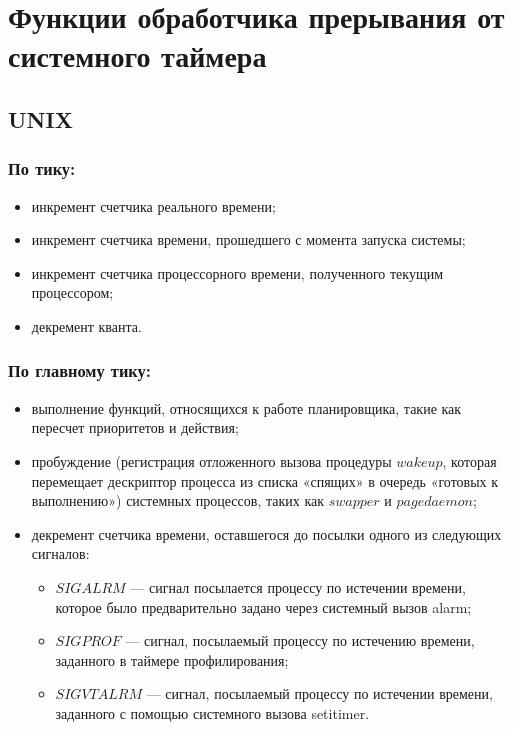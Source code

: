 \chapter{Функции обработчика прерывания от системного таймера}

\section{UNIX}

\subsection*{По тику:}

\begin{itemize}[label=---]
\item инкремент счетчика реального времени;
\item инкремент счетчика времени, прошедшего с момента запуска системы;
\item инкремент счетчика процессорного времени, полученного текущим
процессором;
\item декремент кванта.
\end{itemize}

\subsection*{По главному тику:}

\begin{itemize}[label=---]
\item выполнение функций, относящихся к работе планировщика, такие как пересчет приоритетов и действия;
\item пробуждение (регистрация отложенного вызова процедуры $wakeup$, которая перемещает дескриптор процесса из списка «спящих» в очередь «готовых к выполнению») системных процессов, таких как $swapper$ и $pagedaemon$;
\item декремент счетчика времени, оставшегося до посылки одного из следующих сигналов: 
\begin{itemize}[label=---]
    \item $SIGALRM$ --- сигнал посылается процессу по истечении времени, которое было предварительно задано через системный вызов alarm;
    \item $SIGPROF$ --- сигнал, посылаемый процессу по истечению времени, заданного в таймере профилирования;
    \item $SIGVTALRM$ --- сигнал, посылаемый процессу по истечении времени, заданного с помощью системного вызова setitimer.
\end{itemize}
\end{itemize}

